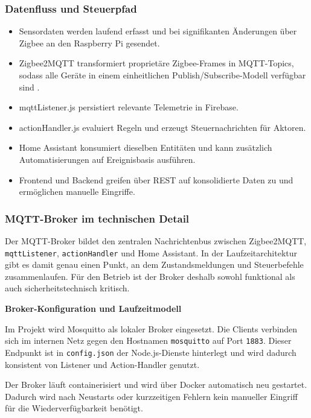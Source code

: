 \subsubsection{Datenfluss und Steuerpfad}

\begin{itemize}
    \item Sensordaten werden laufend erfasst und bei signifikanten Änderungen über Zigbee an den Raspberry Pi gesendet.
    \item Zigbee2MQTT transformiert proprietäre Zigbee-Frames in MQTT-Topics, sodass alle Geräte in einem einheitlichen Publish/Subscribe-Modell verfügbar sind \cite{zigbee2mqtt_usage}.
    \item mqttListener.js persistiert relevante Telemetrie in Firebase.
    \item actionHandler.js evaluiert Regeln und erzeugt Steuernachrichten für Aktoren.
    \item Home Assistant konsumiert dieselben Entitäten und kann zusätzlich Automatisierungen auf Ereignisbasis ausführen.
    \item Frontend und Backend greifen über REST auf konsolidierte Daten zu und ermöglichen manuelle Eingriffe.
\end{itemize}

\subsubsection{MQTT-Broker im technischen Detail}

Der MQTT-Broker bildet den zentralen Nachrichtenbus zwischen Zigbee2MQTT, \texttt{mqttListener}, \texttt{actionHandler} und Home Assistant. In der Laufzeitarchitektur gibt es damit genau einen Punkt, an dem Zustandsmeldungen und Steuerbefehle zusammenlaufen. Für den Betrieb ist der Broker deshalb sowohl funktional als auch sicherheitstechnisch kritisch.

\textbf{Broker-Konfiguration und Laufzeitmodell}

Im Projekt wird Mosquitto als lokaler Broker eingesetzt. Die Clients verbinden sich im internen Netz gegen den Hostnamen \texttt{mosquitto} auf Port \texttt{1883}. Dieser Endpunkt ist in \texttt{config.json} der Node.js-Dienste hinterlegt und wird dadurch konsistent von Listener und Action-Handler genutzt.

Der Broker läuft containerisiert und wird über Docker automatisch neu gestartet. Dadurch wird nach Neustarts oder kurzzeitigen Fehlern kein manueller Eingriff für die Wiederverfügbarkeit benötigt.

